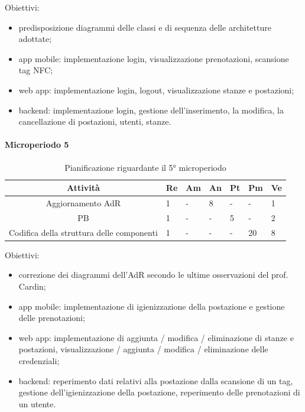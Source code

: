 Obiettivi:
\begin{itemize}
	\item predisposizione diagrammi delle classi e di sequenza delle architetture adottate; 
	\item app mobile: implementazione login, visualizzazione prenotazioni, scansione tag NFC;
	\item web app: implementazione login, logout, visualizzazione stanze e postazioni;
	\item backend: implementazione login, gestione dell'inserimento, la modifica, la cancellazione di postazioni, utenti, stanze.
\end{itemize}

\paragraph{Microperiodo 5}
\begin{table}[H]
	\centering
	\renewcommand{\arraystretch}{1.5}
	\begin{tabular}{|c|p{10mm}|p{10mm}|p{10mm}|p{10mm}|p{10mm}|p{10mm}|}
		\hline
		\rowcolor{lighter-grayer}
		\textbf{Attività}                         & \textbf{Re} & \textbf{Am} & \textbf{An} & \textbf{Pt} & \textbf{Pm} & \textbf{Ve} \\ \hline
		
		Aggiornamento AdR                         & 1           &     -        & 8           &      -       &      -       & 1           \\ \hline
		PB                                        & 1           &      -       &    -         & 5           &      -       & 2           \\ \hline
		Codifica della struttura delle componenti & 1           &       -      &   -          &      -       & 20          & 8           \\ \hline
		
	\end{tabular}
	\caption{ Pianificazione riguardante il 5° microperiodo\\}
\end{table}

Obiettivi:
\begin{itemize}
	\item correzione dei diagrammi dell'AdR secondo le ultime osservazioni del prof. Cardin;
	\item app mobile: implementazione di igienizzazione della postazione e gestione delle prenotazioni;
	\item web app: implementazione di aggiunta / modifica / eliminazione di stanze e postazioni, visualizzazione / aggiunta / modifica / eliminazione delle credenziali;
	\item backend: reperimento dati relativi alla postazione dalla scansione di un tag, gestione dell'igienizzazione della postazione, reperimento delle prenotazioni di un utente.
\end{itemize}

